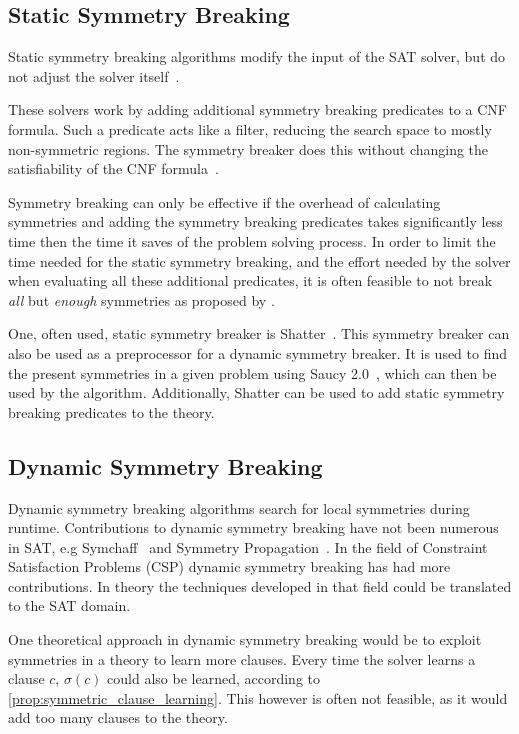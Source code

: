 \subsection{Static Symmetry Breaking}
	Static symmetry breaking algorithms modify the input of the SAT solver, but do not
	adjust the solver itself~\cite{sakallah2009symmetry}.

	These solvers work by adding additional symmetry breaking predicates to a CNF
	formula. Such a predicate acts like a filter, reducing the search space to mostly
	non-symmetric regions.
	The symmetry breaker does this without changing the satisfiability of the CNF formula~\cite{aloul2003shatter}.

	Symmetry breaking can only be effective if the overhead of calculating symmetries and
	adding the symmetry breaking predicates takes significantly less time then the time it
	saves of the problem solving process. In order to limit the time needed for the static
	symmetry breaking, and the effort needed by the solver when evaluating all these
	additional predicates, it is often feasible to not break \emph{all} but \emph{enough}
	symmetries as proposed by \cite{aloul2003shatter}.

	One, often used, static symmetry breaker is Shatter~\cite{aloul2003shatter}.
	This symmetry breaker can also be used as a preprocessor for a dynamic symmetry breaker.
	It is used to find the present symmetries in a given problem using Saucy 2.0~\cite{darga2004exploiting},
	which can then be used by the algorithm.
	Additionally, Shatter can be used to add static symmetry breaking predicates to the theory.

\subsection{Dynamic Symmetry Breaking}
	Dynamic symmetry breaking algorithms search for local symmetries during runtime.
	Contributions to dynamic symmetry breaking have not been numerous in SAT,
	e.g Symchaff~\cite{sabharwal2005symchaff} and Symmetry Propagation~\cite{devriendt2012symmetry}.
	In the field of Constraint Satisfaction	Problems (CSP) dynamic symmetry breaking has had more contributions.
	In theory the techniques developed in that field could be translated to the SAT domain.

	One theoretical approach in dynamic symmetry breaking would be to exploit symmetries in
	a theory to learn more clauses.
	Every time the solver learns a clause $c$, $\sigma(c)$ could also be learned, according
	to \cref{prop:symmetric_clause_learning}.
	This however is often not feasible, as it would add too many clauses to the theory.

